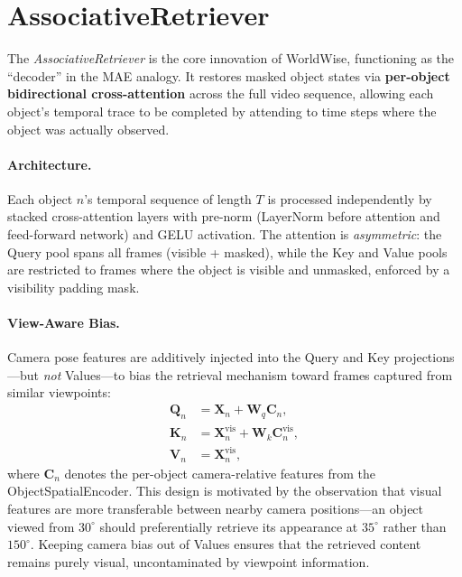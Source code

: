 \documentclass{article}
\newcommand{\mat}[1]{\bm{#1}}
\begin{document}
\section{AssociativeRetriever}
\label{sec:retriever}

The \emph{AssociativeRetriever} is the core innovation of WorldWise, functioning as the ``decoder'' in the MAE analogy.  It restores masked object states via \textbf{per-object bidirectional cross-attention} across the full video sequence, allowing each object's temporal trace to be completed by attending to time steps where the object was actually observed.

\paragraph{Architecture.}  Each object $n$'s temporal sequence of length $T$ is processed independently by stacked cross-attention layers with pre-norm (LayerNorm before attention and feed-forward network) and GELU activation.  The attention is \emph{asymmetric}: the Query pool spans all frames (visible + masked), while the Key and Value pools are restricted to frames where the object is visible and unmasked, enforced by a visibility padding mask.

\paragraph{View-Aware Bias.}  Camera pose features are additively injected into the Query and Key projections---but \emph{not} Values---to bias the retrieval mechanism toward frames captured from similar viewpoints:
\begin{align}
    \mat{Q}_n &= \mat{X}_n + \mat{W}_q \mat{C}_n, \label{eq:query} \\
    \mat{K}_n &= \mat{X}_n^{\text{vis}} + \mat{W}_k \mat{C}_n^{\text{vis}}, \label{eq:key} \\
    \mat{V}_n &= \mat{X}_n^{\text{vis}}, \label{eq:value}
\end{align}
where $\mat{C}_n$ denotes the per-object camera-relative features from the ObjectSpatialEncoder.  This design is motivated by the observation that visual features are more transferable between nearby camera positions---an object viewed from $30^{\circ}$ should preferentially retrieve its appearance at $35^{\circ}$ rather than $150^{\circ}$.  Keeping camera bias out of Values ensures that the retrieved content remains purely visual, uncontaminated by viewpoint information.
\end{document}
